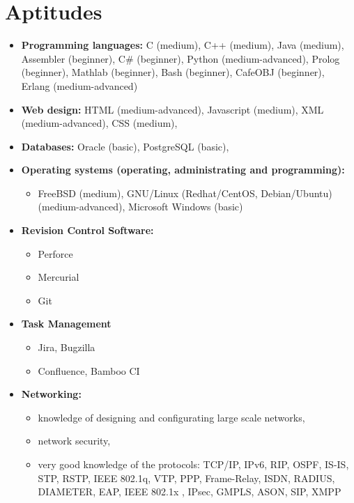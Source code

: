 \documentclass[a4paper,12pt,openany]{article}
\begin{document}
\section{Aptitudes}
	\begin{itemize}
	 	\item \textbf{Programming languages: } C (medium), C++ (medium), Java (medium), Assembler (beginner), C\# (beginner), Python (medium-advanced), Prolog (beginner), Mathlab (beginner), Bash (beginner), CafeOBJ (beginner), Erlang (medium-advanced)
		\item \textbf{Web design:} HTML (medium-advanced), Javascript (medium), XML (medium-advanced), CSS (medium),
		\item \textbf{Databases:} Oracle (basic), PostgreSQL (basic),
		\item \textbf{Operating systems (operating, administrating and programming): }
			\begin{itemize}
			 	\item FreeBSD (medium), GNU/Linux (Redhat/CentOS, Debian/Ubuntu) (medium-advanced), Microsoft Windows (basic)
			\end{itemize}

		\item \textbf{Revision Control Software:}
			\begin{itemize}
				\item Perforce
				\item Mercurial
				\item Git
			\end{itemize}

		\item \textbf{Task Management}	
			\begin{itemize}
				\item Jira, Bugzilla
				\item Confluence, Bamboo CI
			\end{itemize}	
		\item \textbf{Networking:}
			\begin{itemize}
			 	\item knowledge of designing and configurating large scale networks, 
				\item network security, 
				\item very good knowledge of the protocols: TCP/IP, IPv6, RIP, OSPF, IS-IS, STP, RSTP, IEEE 802.1q, VTP, PPP, Frame-Relay, ISDN, RADIUS, DIAMETER, EAP, IEEE 802.1x , IPsec, GMPLS, ASON, SIP, XMPP
			\end{itemize}


\end{itemize}
\end{document}
